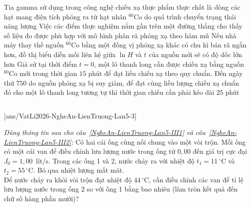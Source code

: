 \begin{ex}
		\choiceTFt
		{Tia gamma sử dụng trong công nghệ chiếu xạ thực phẩm thực chất là dòng các hạt mang điện tích phóng ra từ hạt nhân ${}^{60}\text{Co}$ do quá trình chuyển trạng thái năng lượng}
		{\True Việc các điểm thực nghiệm nằm gần trên một đường thẳng cho thấy số liệu đo được phù hợp với mô hình phân rã phóng xạ theo hàm mũ}
		{\True Nếu nhà máy thay thế nguồn ${}^{60}\text{Co}$ bằng một đồng vị phóng xạ khác có chu kì bán rã ngắn hơn, đồ thị biểu diễn mối liên hệ giữa $\ln H$ và $t$ của nguồn mới sẽ có độ dốc lớn hơn}
		{Giả sử tại thời điểm $t=0$, một lô thanh long cần được chiếu xạ bằng nguồn ${}^{60}\text{Co}$ mới trong thời gian $15$ phút để đạt liều chiếu xạ theo quy chuẩn. Đến ngày thứ $750$ do nguồn phóng xạ bị suy giảm, để đạt cùng liều lượng chiếu xạ chuẩn đó cho một lô thanh long tương tự thì thời gian chiếu cần phải kéo dài $25$ phút}
	\end{ex}

	\subsection*{}
	\setcounter{ex}{0}
	[ans/VatLi2026-NgheAn-LienTruong-Lan5-3]

	\begin{ex}%
		\label{NgheAn-LienTruong-Lan5-III1}\textit{Dùng thông tin sau cho câu~\ref{NgheAn-LienTruong-Lan5-III1} và câu~\ref{NgheAn-LienTruong-Lan5-III2}:} Có hai cái ống cùng nối chung vào một vòi trộn. Mỗi ống có một cái van để điều chỉnh lưu lượng nước trong ống từ $0{,}00$ đến giá trị cực đại $J_0=1{,}00$~lít/s. Trong các ống 1 và 2, nước chảy ra với nhiệt độ $t_1=11\,^\circ\text{C}$ và $t_2=55\,^\circ\text{C}$. Bỏ qua nhiệt lượng mất mát.\\
		Để nước chảy ra khỏi vòi trộn đạt nhiệt độ $44\,^\circ\text{C}$, cần điều chỉnh các van để tỉ lệ lưu lượng nước trong ống 2 so với ống 1 bằng bao nhiêu (làm tròn kết quả đến chữ số hàng phần mười)?
		\par
	\end{ex}

